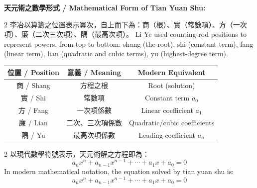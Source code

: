 \documentclass[11pt,a4paper]{article}
\begin{document}
\vspace{0.5cm}

\textbf{天元術之數學形式 / Mathematical Form of Tian Yuan Shu:}

\begin{paracol}{2}
李冶以算籌之位置表示冪次，自上而下為：商（根）、實（常數項）、方（一次項）、廉（二次三次項）、隅（最高次項）。
\switchcolumn
Li Ye used counting-rod positions to represent powers, from top to bottom: shang (the root), shi (constant term), fang (linear term), lian (quadratic and cubic terms), yu (highest-degree term).
\end{paracol}

\vspace{0.3cm}

\begin{center}
\begin{tabular}{c|c|c}
\textbf{位置 / Position} & \textbf{意義 / Meaning} & \textbf{Modern Equivalent} \\
\hline
商 / Shang & 方程之根 & Root (solution) \\
實 / Shi & 常數項 & Constant term $a_0$ \\
方 / Fang & 一次項係數 & Linear coefficient $a_1$ \\
廉 / Lian & 二次、三次項係數 & Quadratic/cubic coefficients \\
隅 / Yu & 最高次項係數 & Leading coefficient $a_n$ \\
\hline
\end{tabular}
\end{center}

\vspace{0.3cm}

\begin{paracol}{2}
以現代數學符號表示，天元術解之方程即為：
$$a_n x^n + a_{n-1} x^{n-1} + \cdots + a_1 x + a_0 = 0$$
\switchcolumn
In modern mathematical notation, the equation solved by tian yuan shu is:
$$a_n x^n + a_{n-1} x^{n-1} + \cdots + a_1 x + a_0 = 0$$
\end{paracol}

\vspace{0.5cm}
\end{document}

